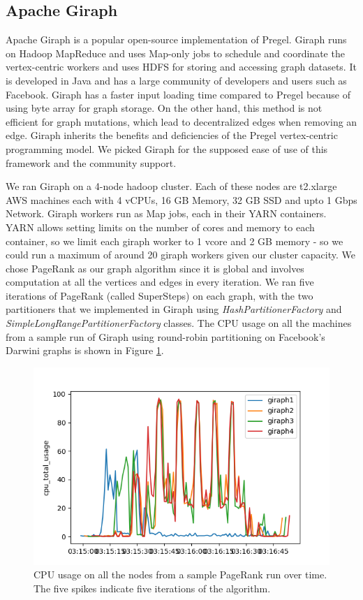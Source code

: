 \subsection{Apache Giraph}
\label{sec:giraph}

Apache Giraph\cite{ApacheGiraph} is a popular open-source implementation of
Pregel\cite{Malewicz:2010:PSL:1807167.1807184}. Giraph runs on Hadoop MapReduce and uses 
Map-only jobs to schedule and coordinate the 
vertex-centric workers and uses HDFS for storing and accessing graph datasets. 
It is developed in Java and has a large community of developers and users such as 
Facebook\cite{GiraphAtFacebook}. Giraph has a faster input loading time compared to Pregel 
because of using byte array for graph storage. On the other hand, this method 
is not efficient for graph mutations, which lead to decentralized edges when removing an edge. 
Giraph inherits the benefits and deficiencies of the Pregel vertex-centric
programming model. We picked Giraph for the supposed ease of use of this framework and the 
community support. 

We ran Giraph on a 4-node hadoop cluster. Each of these nodes are t2.xlarge AWS machines
each with 4 vCPUs, 16 GB Memory, 32 GB SSD and upto 1 Gbps Network. Giraph workers run 
as Map jobs, each in their YARN containers. YARN allows setting limits on the number of cores 
and memory to each container, so we limit each giraph worker to 1 vcore and 2 GB memory - so 
we could run a maximum of around 20 giraph workers given our cluster capacity. 
We chose PageRank as our graph algorithm since it is global and involves computation at all the vertices 
and  edges in every iteration. We ran five iterations of PageRank (called SuperSteps) on each 
graph, with the two partitioners that we implemented in Giraph  using \textit{HashPartitionerFactory} 
and \textit{SimpleLongRangePartitionerFactory} classes. The CPU usage on all the machines 
from a sample run of Giraph using round-robin partitioning on Facebook's Darwini graphs 
is shown in Figure \ref{fig:sample_giraph_run}.

\begin{figure}
	\centering
	\includegraphics[width=\columnwidth]{./samplerun.png}
    \caption{CPU usage on all the nodes from a sample PageRank run over time. The five spikes 
        indicate five iterations of the algorithm.}
	\label{fig:sample_giraph_run}
\end{figure}

